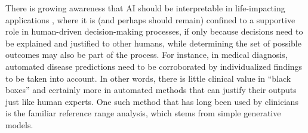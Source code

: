 \documentclass[english]{scrartcl}
\begin{document}

There is growing awareness that AI should be interpretable in life-impacting applications \cite{Molnar-18}, where it is (and perhaps should remain) confined to a supportive role in human-driven decision-making processes, if only because decisions need to be explained and justified to other humans, while determining the set of possible outcomes may also be part of the process. For instance, in medical diagnosis, automated disease predictions need to be corroborated by individualized findings to be taken into account. In other words, there is little clinical value in ``black boxes'' and certainly more in automated methods that can justify their outputs just like human experts. One such method that has long been used by clinicians is the familiar reference range analysis, which stems from simple generative models.


\end{document}
